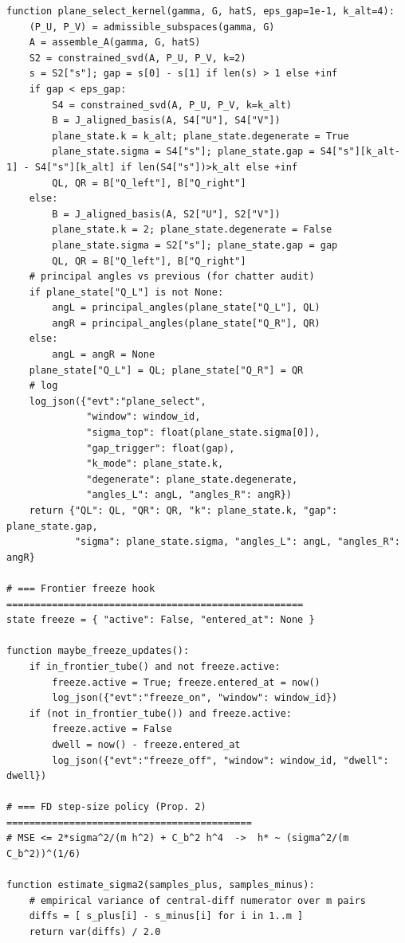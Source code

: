 \begin{lstlisting}
function plane_select_kernel(gamma, G, hatS, eps_gap=1e-1, k_alt=4):
    (P_U, P_V) = admissible_subspaces(gamma, G)
    A = assemble_A(gamma, G, hatS)
    S2 = constrained_svd(A, P_U, P_V, k=2)
    s = S2["s"]; gap = s[0] - s[1] if len(s) > 1 else +inf
    if gap < eps_gap:
        S4 = constrained_svd(A, P_U, P_V, k=k_alt)
        B = J_aligned_basis(A, S4["U"], S4["V"])
        plane_state.k = k_alt; plane_state.degenerate = True
        plane_state.sigma = S4["s"]; plane_state.gap = S4["s"][k_alt-1] - S4["s"][k_alt] if len(S4["s"])>k_alt else +inf
        QL, QR = B["Q_left"], B["Q_right"]
    else:
        B = J_aligned_basis(A, S2["U"], S2["V"])
        plane_state.k = 2; plane_state.degenerate = False
        plane_state.sigma = S2["s"]; plane_state.gap = gap
        QL, QR = B["Q_left"], B["Q_right"]
    # principal angles vs previous (for chatter audit)
    if plane_state["Q_L"] is not None:
        angL = principal_angles(plane_state["Q_L"], QL)
        angR = principal_angles(plane_state["Q_R"], QR)
    else:
        angL = angR = None
    plane_state["Q_L"] = QL; plane_state["Q_R"] = QR
    # log
    log_json({"evt":"plane_select",
              "window": window_id,
              "sigma_top": float(plane_state.sigma[0]),
              "gap_trigger": float(gap),
              "k_mode": plane_state.k,
              "degenerate": plane_state.degenerate,
              "angles_L": angL, "angles_R": angR})
    return {"QL": QL, "QR": QR, "k": plane_state.k, "gap": plane_state.gap,
            "sigma": plane_state.sigma, "angles_L": angL, "angles_R": angR}

# === Frontier freeze hook ====================================================
state freeze = { "active": False, "entered_at": None }

function maybe_freeze_updates():
    if in_frontier_tube() and not freeze.active:
        freeze.active = True; freeze.entered_at = now()
        log_json({"evt":"freeze_on", "window": window_id})
    if (not in_frontier_tube()) and freeze.active:
        freeze.active = False
        dwell = now() - freeze.entered_at
        log_json({"evt":"freeze_off", "window": window_id, "dwell": dwell})

# === FD step-size policy (Prop. 2) ===========================================
# MSE <= 2*sigma^2/(m h^2) + C_b^2 h^4  ->  h* ~ (sigma^2/(m C_b^2))^(1/6)

function estimate_sigma2(samples_plus, samples_minus):
    # empirical variance of central-diff numerator over m pairs
    diffs = [ s_plus[i] - s_minus[i] for i in 1..m ]
    return var(diffs) / 2.0


\end{lstlisting}
